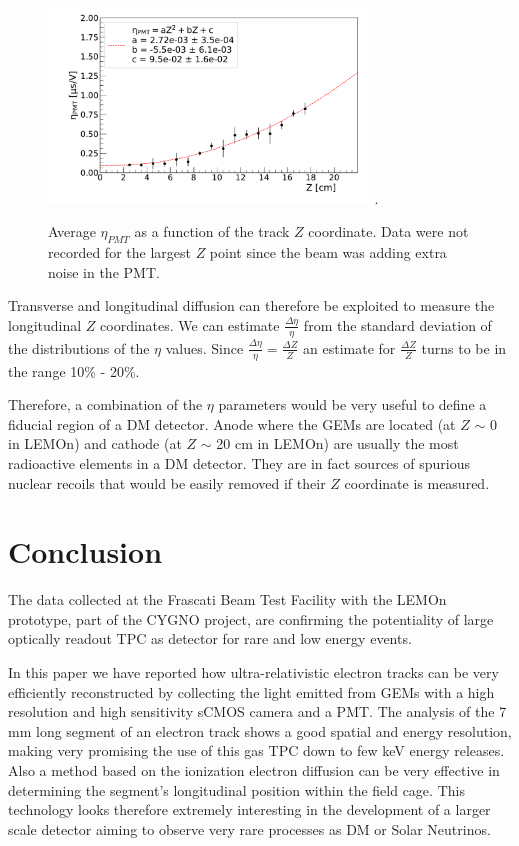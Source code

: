 \documentclass[%
 aip,
 amsmath,amssymb,
 reprint,%
]{revtex4-1}
\begin{document}
\begin{figure}[ht]
\centering
\includegraphics[width=3.4in]{Fig11-eta-PMT-Z.pdf}\DeclareGraphicsExtensions.
\caption{Average $\eta_{PMT}$ as a function of the track $Z$ coordinate. Data were not recorded for the largest $Z$ point since the beam was adding extra noise in the PMT.}
\label{fig:Tdiffusion}
\end{figure}


Transverse  and longitudinal  diffusion can therefore  be exploited to measure the longitudinal $Z$ coordinates. We can estimate $\frac{\Delta \eta}{\eta}$  from the standard deviation of the distributions of the  $\eta$ values. Since $\frac{\Delta \eta}{\eta} =\frac{\Delta Z}{Z} $  an estimate for  $\frac{\Delta Z}{Z}$  turns to be  in the range 10\% - 20\%.  


Therefore, a combination of the $\eta$ parameters would be very  useful to define a fiducial region  of a DM detector. Anode where the GEMs are located (at $Z$ $\sim$ 0 in LEMOn) and cathode  (at $Z$ $\sim$ 20 cm in LEMOn) are usually  the most radioactive elements in a DM detector. They are in fact sources of spurious nuclear recoils that would be easily  removed if  their $Z$ coordinate is measured.

\section{Conclusion}

The data collected at the Frascati Beam Test Facility with the LEMOn prototype, part of the CYGNO project, are confirming the potentiality of large optically readout  TPC  as detector for rare and low energy events. 

In this paper we have reported how  ultra-relativistic electron tracks can be  very efficiently reconstructed by collecting the light emitted from GEMs with a high resolution and high sensitivity sCMOS camera and a PMT.
 The analysis of the 7 mm long  segment of an electron track shows a  good spatial  and  energy resolution,  making  very promising the use of this  gas TPC down to few keV energy releases. Also a method based on the ionization electron diffusion can be very effective in determining  the segment's longitudinal position within the field cage. 
  This technology looks therefore extremely interesting in the development of a larger scale detector aiming to observe very rare processes as DM or Solar Neutrinos.
  
\end{document}
